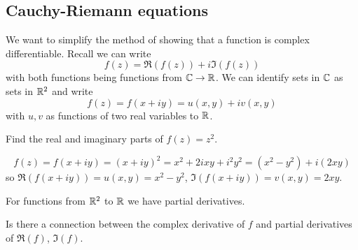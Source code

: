 \documentclass[10pt, a4paper]{article}
\begin{document}
\subsection{Cauchy-Riemann equations}
We want to simplify the method of showing that a function is complex differentiable.
Recall we can write
\[
f(z) = \Re(f(z)) + i\Im(f(z))
\]
with both functions being functions from $\mathbb{C} \to \mathbb{R}$.
We can identify sets in $\mathbb{C}$ as sets in $\mathbb{R} ^ 2$ and write
\[
f(z) = f(x + iy) = u(x, y) + iv(x, y)
\]
with $u, v$ as functions of two real variables to $\mathbb{R}$.

\begin{example}
    Find the real and imaginary parts of $f(z) = z ^ 2$.

    \begin{solution}
        \[
        f(z) = f(x + iy) = (x + iy) ^ 2 = x ^ 2 + 2ixy + i ^ 2y ^ 2 = (x ^ 2 - y ^ 2) + i(2xy)
        \]
        so $\Re(f(x + iy)) = u(x, y) = x ^ 2 - y ^ 2$,
        $\Im(f(x + iy)) = v(x, y) = 2xy$.
    \end{solution}
\end{example}

For functions from $\mathbb{R} ^ 2$ to $\mathbb{R}$ we have partial derivatives.

Is there a connection between the complex derivative of $f$ and partial derivatives of $\Re(f)$,
$\Im(f)$.
\end{document}
